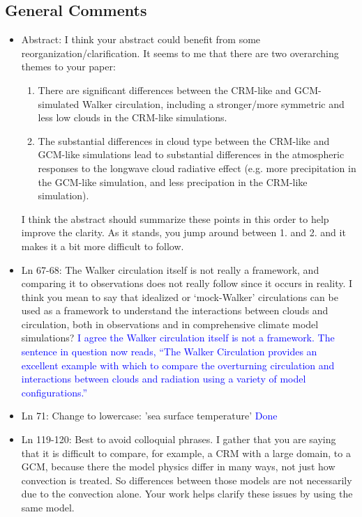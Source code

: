 \documentclass[draft]{agujournal2019}
\begin{document}

\subsection{General Comments}

\begin{itemize}
\item Abstract: 
I think your abstract could benefit from some  reorganization/clarification. It seems to me that there are two overarching themes to your paper:
    \begin{enumerate}
  \item There are significant differences between the CRM-like and GCM-simulated Walker circulation, including a stronger/more symmetric and less low clouds in the CRM-like simulations.
  \item The substantial differences in cloud type between the CRM-like and GCM-like simulations lead to substantial differences in the  atmospheric responses to the longwave cloud radiative effect (e.g. more precipitation in the GCM-like simulation, and less precipation in the CRM-like simulation). 
    \end{enumerate}
    I think the abstract should summarize these points in this order to help improve the clarity.
   As it stands, you jump around between 1. and 2. and it makes it a bit more difficult to follow. 
    
\item Ln 67-68:  The Walker circulation itself is not really a framework, and comparing it to observations does not really follow since it occurs in reality. I think you mean to say that idealized or ‘mock-Walker’ circulations can be used as a framework to understand the interactions between clouds and circulation, both in observations and in comprehensive climate model simulations? 
  \textcolor{blue}{I agree the Walker circulation itself is not a framework.  The sentence in question now reads, ``The Walker Circulation provides an excellent example with which to compare the overturning circulation and interactions between clouds and radiation using a variety of model configurations.''}

\item Ln 71: Change to lowercase: 'sea surface temperature'  
  \textcolor{blue}{Done}
  
  \item Ln 119-120: Best to avoid colloquial phrases. I gather that you are saying that it is difficult to compare, for example, a CRM with a large domain, to a GCM, because there the model physics differ in many ways, not just how convection is treated. So differences between those models are not necessarily due to the convection alone. Your work helps clarify these issues by using the same model.
  

\end{itemize}
\end{document}
